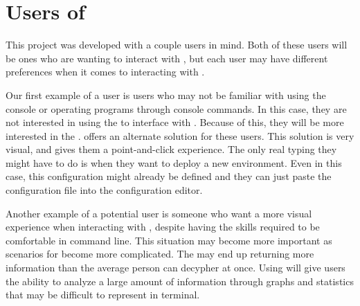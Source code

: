 \section{Users of \projectName}
\label{makereference1.3}

This project was developed with a couple users in mind. Both of these users will be ones who are wanting to interact with \ancor{}, but each user may have different preferences when it comes to interacting with \ancor{}.

Our first example of a user is users who may not be familiar with using the console or operating programs through console commands. In this case, they are not interested in using the \ancorcli{} to interface with \ancor{}. Because of this, they will be more interested in the \projectName{}. \projectName{} offers an alternate solution for these users. This solution is very visual, and gives them a point-and-click experience. The only real typing they might have to do is when they want to deploy a new environment. Even in this case, this configuration might already be defined and they can just paste the configuration file into the \ancor{} configuration editor.

Another example of a potential \projectName{} user is someone who want a more visual experience when interacting with \ancor{}, despite having the skills required to be comfortable in command line. This situation may become more important as scenarios for \ancor{} become more complicated. The \ancorcli{} may end up returning more information than the average person can decypher at once. Using \projectName{} will give users the ability to analyze a large amount of information through graphs and statistics that may be difficult to represent in terminal.

